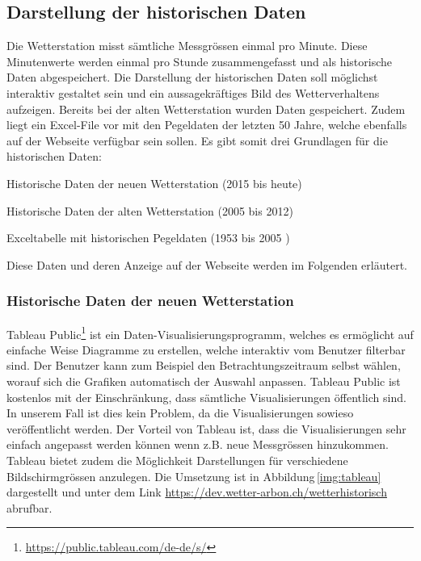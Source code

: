 \subsection{Darstellung der historischen Daten}
Die Wetterstation misst sämtliche Messgrössen einmal pro Minute. Diese Minutenwerte werden einmal pro Stunde zusammengefasst und als historische Daten abgespeichert. Die Darstellung der historischen Daten soll möglichst interaktiv gestaltet sein und ein aussagekräftiges Bild des Wetterverhaltens aufzeigen. Bereits bei der alten Wetterstation wurden Daten gespeichert. Zudem liegt ein Excel-File vor mit den Pegeldaten der letzten 50 Jahre, welche ebenfalls auf der Webseite verfügbar sein sollen. Es gibt somit drei Grundlagen für die historischen Daten:

\begin{itemize*}
\item Historische Daten der neuen Wetterstation (2015 bis heute)
\item Historische Daten der alten Wetterstation (2005 bis 2012)
\item Exceltabelle mit historischen Pegeldaten (1953 bis 2005 )
\end{itemize*}

\noindent
Diese Daten und deren Anzeige auf der Webseite werden im Folgenden erläutert.



\subsubsection{Historische Daten der neuen Wetterstation}
\label{kap:Tableau}
Tableau Public\footnote{ \url{https://public.tableau.com/de-de/s/}} ist ein Daten-Visualisierungsprogramm, welches es ermöglicht auf einfache Weise Diagramme zu erstellen, welche interaktiv vom Benutzer filterbar sind. Der Benutzer kann zum Beispiel den Betrachtungszeitraum selbst wählen, worauf sich die Grafiken automatisch der Auswahl anpassen. Tableau Public ist kostenlos mit der Einschränkung, dass sämtliche Visualisierungen öffentlich sind. In unserem Fall ist dies kein Problem, da die Visualisierungen sowieso veröffentlicht werden. Der Vorteil von Tableau ist, dass die Visualisierungen sehr einfach angepasst werden können wenn z.B. neue Messgrössen hinzukommen. Tableau bietet zudem die Möglichkeit Darstellungen für verschiedene Bildschirmgrössen anzulegen. Die Umsetzung ist in Abbildung\,\ref{img:tableau} dargestellt und unter dem Link \url{https://dev.wetter-arbon.ch/wetterhistorisch} abrufbar.

